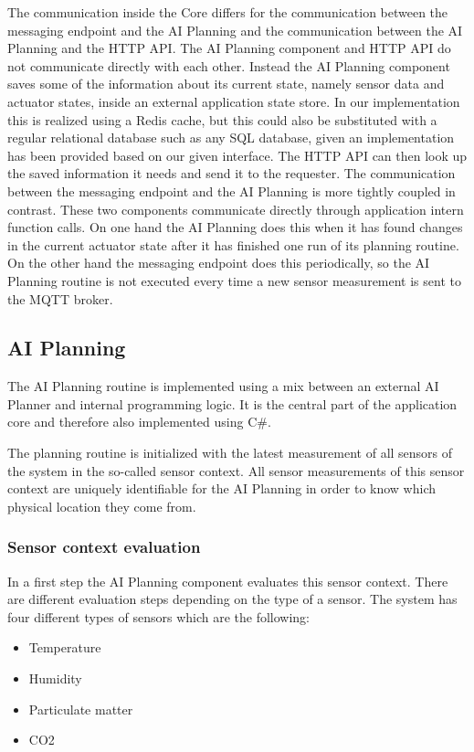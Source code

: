 \documentclass[runningheads]{llncs}
\begin{document}
    The communication inside the Core differs for the communication between the messaging endpoint and the AI Planning and the communication between the AI Planning and the HTTP API. 
    The AI Planning component and HTTP API do not communicate directly with each other. Instead the AI Planning component saves some of the information about its current state, namely sensor data and actuator states, inside an external application state store. In our implementation this is realized using a Redis cache, but this could also be substituted with a regular relational database such as any SQL database, given an implementation has been provided based on our given interface. The HTTP API can then look up the saved information it needs and send it to the requester. 
    The communication between the messaging endpoint and the AI Planning is more tightly coupled in contrast. These two components communicate directly through application intern function calls. On one hand the AI Planning does this when it has found changes in the current actuator state after it has finished one run of its planning routine. On the other hand the messaging endpoint does this periodically, so the AI Planning routine is not executed every time a new sensor measurement is sent to the MQTT broker. 

    \subsection{AI Planning}
    The AI Planning routine is implemented using a mix between an external AI Planner and internal programming logic. It is the central part of the application core and therefore also implemented using C\#. 

    The planning routine is initialized with the latest measurement of all sensors of the system in the so-called sensor context. All sensor measurements of this sensor context are uniquely identifiable for the AI Planning in order to know which physical location they come from. 

    \subsubsection{Sensor context evaluation}
    In a first step the AI Planning component evaluates this sensor context. There are different evaluation steps depending on the type of a sensor. The system has four different types of sensors which are the following:
    \begin{itemize}
        \item Temperature
        \item Humidity
        \item Particulate matter
        \item CO2
    \end{itemize}
\end{document}
